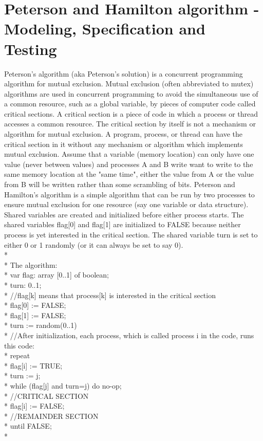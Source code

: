 \section{Peterson and Hamilton algorithm - Modeling,  Specification and Testing}


Peterson's algorithm (aka Peterson's solution) is a concurrent programming algorithm for mutual exclusion. Mutual exclusion (often abbreviated to mutex) algorithms are used in concurrent programming to avoid the simultaneous use of a common resource, such as a global variable, by pieces of computer code called critical sections. A critical section is a piece of code in which a process or thread accesses a common resource. The critical section by itself is not a mechanism or algorithm for mutual exclusion. A program, process, or thread can have the critical section in it without any mechanism or algorithm which implements mutual exclusion. Assume that a variable (memory location) can only have one value (never between values) and processes A and B write want to write to the same memory location at the "same time", either the value from A or the value from B will be written rather than some scrambling of bits. Peterson and Hamilton's algorithm is a simple algorithm that can be run by two processes to ensure mutual exclusion for one resource (say one variable or data structure). Shared variables are created and initialized before either process starts. The shared variables flag[0] and flag[1] are initialized to FALSE because neither process is yet interested in the critical section. The shared variable turn is set to either 0 or 1 randomly (or it can always be set to say 0).\\*\\*
The algorithm:\\*
var flag: array [0..1] of boolean; \\*
turn: 0..1; \\*
//flag[k] means that process[k] is interested in the critical section \\*
flag[0] := FALSE; \\*
flag[1] := FALSE; \\*
turn := random(0..1) \\*
//After initialization, each process, which is called process i in the code, runs this code: \\*
repeat \\*
flag[i] := TRUE; \\*
turn := j; \\*
while (flag[j] and turn=j) do no-op; \\*
//CRITICAL SECTION \\*
flag[i] := FALSE; \\*
//REMAINDER SECTION \\*
until FALSE;\\*

